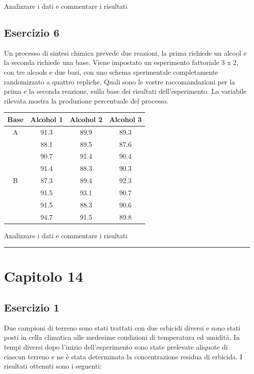 \documentclass[a4paper,12pt,oneside]{book}
\begin{document}
Analizzare i dati e commentare i risultati

\hypertarget{esercizio-6-2}{%
\subsection{Esercizio 6}\label{esercizio-6-2}}

Un processo di sintesi chimica prevede due reazioni, la prima richiede un alcool e la seconda richiede una base. Viene impostato un esperimento fattoriale 3 x 2, con tre alcools e due basi, con uno schema sperimentale completamente randomizzato a quattro repliche. Quali sono le vostre raccomandazioni per la prima e la seconda reazione, sulla base dei risultati dell'esperimento. La variabile rilevata mostra la produzione percentuale del processo.

\begin{longtable}[]{@{}cccc@{}}
\toprule
Base & Alcohol 1 & Alcohol 2 & Alcohol 3 \\
\midrule
\endhead
A & 91.3 & 89.9 & 89.3 \\
& 88.1 & 89.5 & 87.6 \\
& 90.7 & 91.4 & 90.4 \\
& 91.4 & 88.3 & 90.3 \\
B & 87.3 & 89.4 & 92.3 \\
& 91.5 & 93.1 & 90.7 \\
& 91.5 & 88.3 & 90.6 \\
& 94.7 & 91.5 & 89.8 \\
\bottomrule
\end{longtable}

Analizzare i dati e commentare i risultati

\begin{center}\rule{0.5\linewidth}{0.5pt}\end{center}

\hypertarget{capitolo-14}{%
\section{Capitolo 14}\label{capitolo-14}}

\hypertarget{esercizio-1-9}{%
\subsection{Esercizio 1}\label{esercizio-1-9}}

Due campioni di terreno sono stati trattati con due erbicidi diversi e sono stati posti in cella climatica alle medesime condizioni di temperatura ed umidità. In tempi diversi dopo l'inizio dell'esperimento sono state prelevate aliquote di ciascun terreno e ne è stata determinata la concentrazione residua di erbicida. I risultati ottenuti sono i seguenti:
\end{document}
